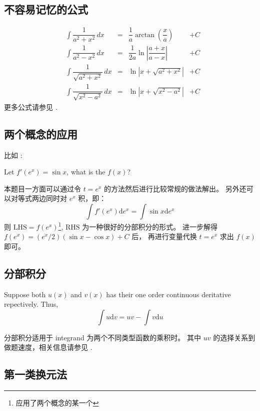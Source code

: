 \subsection{不容易记忆的公式}

\begin{align}
    &\int \dfrac{1}{{a^2 + x^2}} \, dx          &=& \dfrac{1}{a} \arctan \left( \dfrac{x}{a} \right)      &+ C\\
    &\int \dfrac{1}{{a^2 - x^2}} \, dx          &=& \dfrac{1}{2a} \ln \left| \dfrac{a + x}{a - x} \right| &+ C\\
    &\int \dfrac{1}{{\sqrt{a^2 + x^2}}} \, dx   &=& \ln \left| x + \sqrt{a^2 + x^2} \right|               &+ C\\
    &\int \dfrac{1}{{\sqrt{x^2 - a^2}}} \, dx   &=& \ln \left| x + \sqrt{x^2 - a^2} \right|               &+ C
\end{align}
更多公式请参见 \cite[page 93, pdf 104]{we}.

\subsection{两个概念的应用}

比如 \cite[page 101, example 1]{we}:
\begin{example}
    Let $f'(e^x) = \sin x$, what is the $f(x)$?
\end{example}
本题目一方面可以通过令 $t = e^x$ 的方法然后进行比较常规的做法解出。
另外还可以对等式两边同时对 $e^x$ 积，即：
\[
    \int f'(e^x) \mbox{d} e^x = \int \sin x \mbox{d} e^x
\]
则 $\mbox{LHS} = f(e^x)$\footnote{应用了两个概念的某一个}, 
$\mbox{RHS}$ 为一种很好的分部积分的形式。
进一步解得 $f(e^x) = (e^x/2) (\sin x - \cos x) + C$ 后，
再进行变量代换 $t = e^x$ 求出 $f(x)$ 即可。

\subsection{分部积分}\label{part-integral}

\begin{definition}
    Suppose both $u(x)$ and $v(x)$ has their one order continuous deritative repectively.
    Thus, 
    \[
        \int u \mbox{d} v = uv - \int v \mbox{d} u
    \]
\end{definition}

分部积分适用于 integrand 为两个不同类型函数的乘积时。
其中 $uv$ 的选择关系到做题速度，相关信息请参见 \cite[page 95, pdf 106]{we}.

\subsection{第一类换元法}


